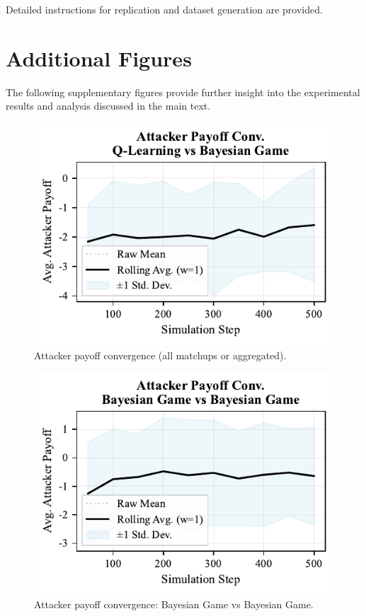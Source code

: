 \documentclass[conference]{IEEEtran}
\begin{document}
Detailed instructions for replication and dataset generation are provided.

\appendix
\section{Additional Figures}
The following supplementary figures provide further insight into the experimental results and analysis discussed in the main text.

\begin{figure}[h!]
    \centering
    \includegraphics[width=0.9\linewidth]{figures/appendix/fig_atk_convergence.pdf}
    \caption{Attacker payoff convergence (all matchups or aggregated).}
\end{figure}

\begin{figure}[h!]
    \centering
    \includegraphics[width=0.9\linewidth]{figures/appendix/fig_atk_convergence_Bayesian_Game_vs_Bayesian_Game.pdf}
    \caption{Attacker payoff convergence: Bayesian Game vs Bayesian Game.}
\end{figure}
\end{document}

